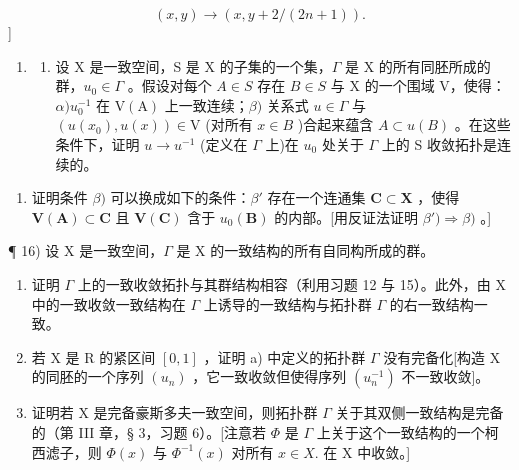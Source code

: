 \[
(x, y) \rightarrow (x, y + 2 / (2 n + 1)).
\]
{]}

\begin{enumerate}
\def\labelenumi{\arabic{enumi})}
\setcounter{enumi}{14}
\tightlist
\item
  \begin{enumerate}
  \def\labelenumii{\alph{enumii})}
  \tightlist
  \item
    设 X 是一致空间，S 是 X 的子集的一个集，\(\Gamma\) 是 X 的所有同胚所成的群，\(u_{0} \in \Gamma\) 。假设对每个 \(A \in S\) 存在 \(B \in S\) 与 X 的一个围域 V，使得：\(\alpha) u_{0}^{-1}\) 在 \(\mathrm{V}(\mathrm{A})\) 上一致连续；\(\beta)\) 关系式 \(u \in \Gamma\) 与 \((u(x_{0}), u(x)) \in \mathrm{V}\) (对所有 \(x \in B\) )合起来蕴含 \(A \subset u(B)\) 。在这些条件下，证明 \(u \to u^{-1}\) (定义在 \(\Gamma\) 上)在 \(u_{0}\) 处关于 \(\Gamma\) 上的 S 收敛拓扑是连续的。
  \end{enumerate}
\end{enumerate}

\begin{enumerate}
\def\labelenumi{\alph{enumi})}
\setcounter{enumi}{1}
\tightlist
\item
  证明条件 \(\beta)\) 可以换成如下的条件：\(\beta'\) 存在一个连通集 \(\mathbf{C} \subset \mathbf{X}\) ，使得 \(\mathbf{V}(\mathbf{A}) \subset \mathbf{C}\) 且 \(\mathbf{V}(\mathbf{C})\) 含于 \(u_0(\mathbf{B})\) 的内部。{[}用反证法证明 \(\beta') \Longrightarrow \beta)\) 。{]}
\end{enumerate}

¶ 16) 设 X 是一致空间，\(\Gamma\) 是 X 的一致结构的所有自同构所成的群。

\begin{enumerate}
\def\labelenumi{\alph{enumi})}
\item
  证明 \(\Gamma\) 上的一致收敛拓扑与其群结构相容（利用习题 12 与 15）。此外，由 X 中的一致收敛一致结构在 \(\Gamma\) 上诱导的一致结构与拓扑群 \(\Gamma\) 的右一致结构一致。
\item
  若 X 是 R 的紧区间 \([0, 1]\) ，证明 a) 中定义的拓扑群 \(\Gamma\) 没有完备化{[}构造 X 的同胚的一个序列 \((u_{n})\) ，它一致收敛但使得序列 \((u_{n}^{-1})\) 不一致收敛{]}。
\item
  证明若 X 是完备豪斯多夫一致空间，则拓扑群 \(\Gamma\) 关于其双侧一致结构是完备的（第 III 章，§ 3，习题 6）。{[}注意若 \(\Phi\) 是 \(\Gamma\) 上关于这个一致结构的一个柯西滤子，则 \(\Phi(x)\) 与 \(\Phi^{-1}(x)\) 对所有 \(x \in X.\) 在 X 中收敛。{]}
\end{enumerate}


